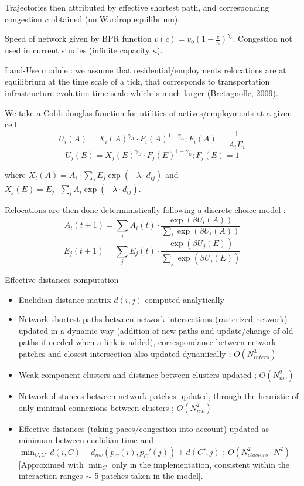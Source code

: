Trajectories then attributed by effective shortest path, and corresponding congestion $c$ obtained (no Wardrop equilibrium). 

Speed of network given by BPR function $v(c) = v_0 \left(1 - \frac{c}{\kappa}\right)^{\gamma_c}$. Congestion not used in current studies (infinite capacity $\kappa$).



\bigskip
\bigskip

\newpage

Land-Use module : we assume that residential/employments relocations are at equilibrium at the time scale of a tick, that corresponds to transportation infrastructure evolution time scale which is much larger (Bretagnolle, 2009).

We take a Cobb-douglas function for utilities of actives/employments at a given cell
\[
U_i (A) = X_i(A)^{\gamma_A}\cdot {F_i(A)}^{1-\gamma_A} ; F_i(A) = \frac{1}{A_i E_i}
\]
\[
U_j (E) = X_j(E)^{\gamma_E}\cdot {F_j(E)}^{1-\gamma_E} ; F_j(E) = 1
\]

where $X_i(A) = A_i\cdot \sum_j{E_j \exp{\left(-\lambda\cdot d_{ij}\right)}}$ and $X_j(E) = E_j\cdot \sum_i{A_i \exp{\left(-\lambda\cdot d_{ij}\right)}}$.

Relocations are then done deterministically following a discrete choice model :
\[
A_i(t+1) = \sum_i{A_i(t)}\cdot\frac{\exp{(\beta U_i(A))}}{\sum_i{\exp{(\beta U_i(A))}}}
\]
\[
E_j(t+1) = \sum_j{E_j(t)}\cdot\frac{\exp{(\beta U_j(E))}}{\sum_j{\exp{(\beta U_j(E))}}}
\]




\newpage

Effective distances computation

\begin{itemize}
\item Euclidian distance matrix $d(i,j)$ computed analytically
\item Network shortest paths between network intersections (rasterized network) updated in a dynamic way (addition of new paths and update/change of old paths if needed when a link is added), correspondance between network patches and closest intersection also updated dynamically ; $O(N_{inters}^3)$
\item Weak component clusters and distance between clusters updated ; $O(N_{nw}^2)$
\item Network distances between network patches updated, through the heuristic of only minimal connexions between clusters ; $O(N_{nw}^2)$
\item Effective distances (taking paces/congestion into account) updated as minimum between euclidian time and $\min_{C,C'}{d(i,C)+d_{nw}(p_C(i),p_C'(j))+d(C',j)}$ ; $O(N_{clusters}^2\cdot N^2)$ [Approximed with $\min_C$ only in the implementation, consistent within the interaction ranges $\sim$ 5 patches taken in the model]. 
\end{itemize}








